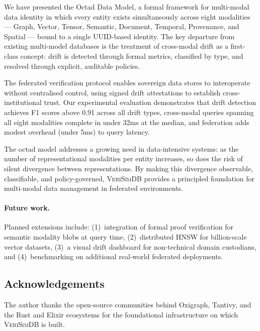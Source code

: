 \documentclass[11pt,twocolumn]{article}
\newcommand{\verisimdb}{\textsc{VeriSimDB}\xspace}
\begin{document}
We have presented the Octad Data Model, a formal framework for multi-modal
data identity in which every entity exists simultaneously across eight
modalities --- Graph, Vector, Tensor, Semantic, Document, Temporal,
Provenance, and Spatial --- bound to a single UUID-based identity.  The
key departure from existing multi-model databases is the treatment of
cross-modal drift as a first-class concept: drift is detected through
formal metrics, classified by type, and resolved through explicit,
auditable policies.

The federated verification protocol enables sovereign data stores to
interoperate without centralised control, using signed drift attestations
to establish cross-institutional trust.  Our experimental evaluation
demonstrates that drift detection achieves F1 scores above 0.91 across all
drift types, cross-modal queries spanning all eight modalities complete in
under 32ms at the median, and federation adds modest overhead (under 5ms)
to query latency.

The octad model addresses a growing need in data-intensive systems: as the
number of representational modalities per entity increases, so does the
risk of silent divergence between representations.  By making this
divergence observable, classifiable, and policy-governed, \verisimdb
provides a principled foundation for multi-modal data management in
federated environments.

\paragraph{Future work.}
Planned extensions include: (1)~integration of formal proof verification
for semantic modality blobs at query time, (2)~distributed HNSW for
billion-scale vector datasets, (3)~a visual drift dashboard for
non-technical domain custodians, and (4)~benchmarking on additional
real-world federated deployments.

\subsection*{Acknowledgements}

The author thanks the open-source communities behind Oxigraph, Tantivy,
and the Rust and Elixir ecosystems for the foundational infrastructure on
which \verisimdb is built.
\end{document}
